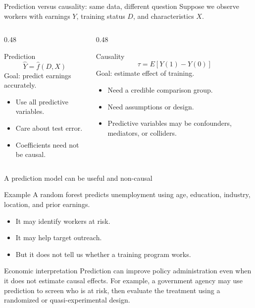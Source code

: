 \documentclass[aspectratio=169,11pt]{beamer}
\newcommand{\econ}[1]{\begin{exampleblock}{Economic interpretation}#1\end{exampleblock}}
\begin{document}
\begin{frame}{Prediction versus causality: same data, different question}
Suppose we observe workers with earnings $Y$, training status $D$, and characteristics $X$.
\begin{columns}
\begin{column}{0.48\textwidth}
\begin{block}{Prediction}
\[
\widehat{Y} = \widehat f(D,X)
\]
Goal: predict earnings accurately.
\begin{itemize}
  \item Use all predictive variables.
  \item Care about test error.
  \item Coefficients need not be causal.
\end{itemize}
\end{block}
\end{column}
\begin{column}{0.48\textwidth}
\begin{alertblock}{Causality}
\[
\tau = E[Y(1)-Y(0)]
\]
Goal: estimate effect of training.
\begin{itemize}
  \item Need a credible comparison group.
  \item Need assumptions or design.
  \item Predictive variables may be confounders, mediators, or colliders.
\end{itemize}
\end{alertblock}
\end{column}
\end{columns}
\end{frame}

\begin{frame}{A prediction model can be useful and non-causal}
\begin{block}{Example}
A random forest predicts unemployment using age, education, industry, location, and prior earnings.
\end{block}
\begin{itemize}
  \item It may identify workers at risk.
  \item It may help target outreach.
  \item But it does not tell us whether a training program works.
\end{itemize}
\econ{
Prediction can improve policy administration even when it does not estimate causal effects. For example, a government agency may use prediction to screen who is at risk, then evaluate the treatment using a randomized or quasi-experimental design.
}
\end{frame}
\end{document}
